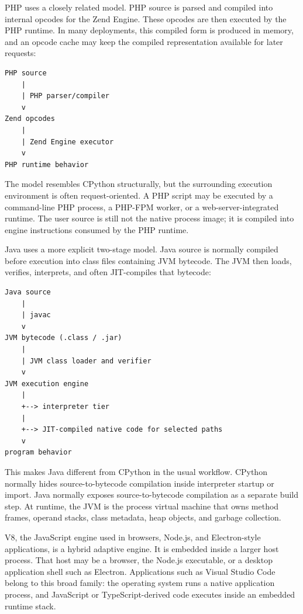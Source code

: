 PHP uses a closely related model. PHP source is parsed and compiled into internal opcodes for the Zend Engine. These opcodes are then executed by the PHP runtime. In many deployments, this compiled form is produced in memory, and an opcode cache may keep the compiled representation available for later requests:

\begin{verbatim}
PHP source
    |
    | PHP parser/compiler
    v
Zend opcodes
    |
    | Zend Engine executor
    v
PHP runtime behavior
\end{verbatim}

The model resembles CPython structurally, but the surrounding execution environment is often request-oriented. A PHP script may be executed by a command-line PHP process, a PHP-FPM worker, or a web-server-integrated runtime. The user source is still not the native process image; it is compiled into engine instructions consumed by the PHP runtime.

Java uses a more explicit two-stage model. Java source is normally compiled before execution into class files containing JVM bytecode. The JVM then loads, verifies, interprets, and often JIT-compiles that bytecode:

\begin{verbatim}
Java source
    |
    | javac
    v
JVM bytecode (.class / .jar)
    |
    | JVM class loader and verifier
    v
JVM execution engine
    |
    +--> interpreter tier
    |
    +--> JIT-compiled native code for selected paths
    v
program behavior
\end{verbatim}

This makes Java different from CPython in the usual workflow. CPython normally hides source-to-bytecode compilation inside interpreter startup or import. Java normally exposes source-to-bytecode compilation as a separate build step. At runtime, the JVM is the process virtual machine that owns method frames, operand stacks, class metadata, heap objects, and garbage collection.

V8, the JavaScript engine used in browsers, Node.js, and Electron-style applications, is a hybrid adaptive engine. It is embedded inside a larger host process. That host may be a browser, the Node.js executable, or a desktop application shell such as Electron. Applications such as Visual Studio Code belong to this broad family: the operating system runs a native application process, and JavaScript or TypeScript-derived code executes inside an embedded runtime stack.

